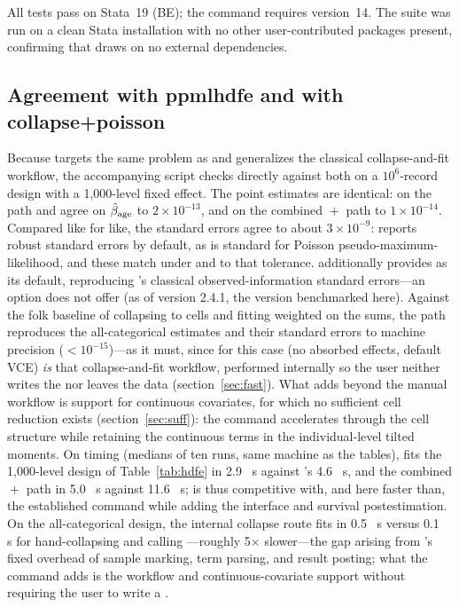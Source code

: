 \documentclass[12pt,a4paper]{article}
\begin{document}
All tests pass on Stata~19 (BE); the command requires
version~14. The suite was run on a clean Stata
installation with no other user-contributed packages present, confirming
that  draws on no external dependencies.

\subsection{Agreement with ppmlhdfe and with
collapse+poisson}\label{agreement-with-ppmlhdfe-and-with-collapsepoisson}

\label{sec:headtohead}

Because  targets the same problem as 
and  generalizes the classical collapse-and-fit workflow,
the accompanying script  checks
 directly against both on a \(10^6\)-record design with a
1,000-level fixed effect. The point estimates are identical: on the
 path  and  agree on
\(\hat{\beta}_{\rm age}\) to \(2\times10^{-13}\), and on the combined
\({}+{}\) path to \(1\times10^{-14}\).
Compared like for like, the standard errors agree to about
\(3\times10^{-9}\):  reports robust standard errors by
default, as is standard for Poisson pseudo-maximum-likelihood, and these
match  under  and 
to that tolerance.  additionally provides 
as its default, reproducing 's classical
observed-information standard errors---an option  does
not offer (as of version 2.4.1, the version benchmarked here). Against
the folk baseline of collapsing to cells and fitting weighted
 on the sums, the  path reproduces the
all-categorical estimates and their standard errors to machine precision
(\(<10^{-15}\))---as it must, since for this case (no absorbed effects,
default VCE)  \emph{is} that collapse-and-fit workflow,
performed internally so the user neither writes the  nor
leaves the  data (section~\ref{sec:fast}).
What  adds beyond the manual workflow is support for
continuous covariates, for which no sufficient cell reduction exists
(section~\ref{sec:suff}): the command accelerates
through the cell structure while retaining the continuous terms in the
individual-level tilted moments. On timing (medians of ten runs, same
machine as the tables),  fits the 1,000-level
design of Table~\ref{tab:hdfe} in 2.9~ s
against 's 4.6~ s, and the combined
\({}+{}\) path in 5.0~ s
against 11.6~ s;  is thus competitive with,
and here faster than, the established command while adding the
 interface and survival postestimation. On the
all-categorical design, the internal collapse route fits in
0.5~ s versus 0.1~ s for hand-collapsing and
calling ---roughly 5\(\times\) slower---the gap arising
from 's fixed overhead of sample marking, term parsing,
and result posting; what the command adds is the  workflow
and continuous-covariate support without requiring the user to write a
.
\end{document}
